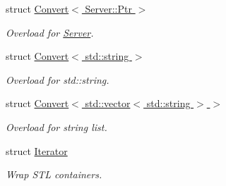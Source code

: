 \begin{DoxyCompactItemize}
struct \hyperlink{a00014}{Convert$<$ Server\-::\-Ptr $>$}
\begin{DoxyCompactList}\small\item\em Overload for \hyperlink{a00055}{Server}. \end{DoxyCompactList}\item 
struct \hyperlink{a00015}{Convert$<$ std\-::string $>$}
\begin{DoxyCompactList}\small\item\em Overload for std\-::string. \end{DoxyCompactList}\item 
struct \hyperlink{a00016}{Convert$<$ std\-::vector$<$ std\-::string $>$ $>$}
\begin{DoxyCompactList}\small\item\em Overload for string list. \end{DoxyCompactList}\item 
struct \hyperlink{a00037}{Iterator}
\begin{DoxyCompactList}\small\item\em Wrap S\-T\-L containers. \end{DoxyCompactList}\end{DoxyCompactItemize}
